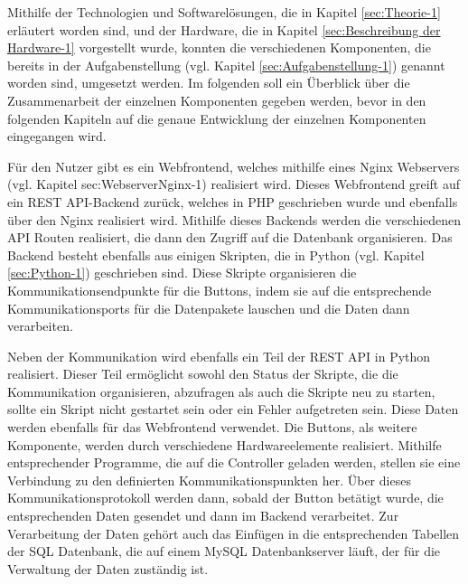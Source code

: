 Mithilfe der Technologien und Softwarelösungen, die in Kapitel \ref{sec:Theorie-1} erläutert worden sind, und der Hardware, die in Kapitel \ref{sec:Beschreibung der Hardware-1} vorgestellt wurde, konnten die verschiedenen Komponenten, die bereits in der Aufgabenstellung (vgl. Kapitel \ref{sec:Aufgabenstellung-1}) genannt worden sind, umgesetzt werden. 
Im folgenden soll ein Überblick über die Zusammenarbeit der einzelnen Komponenten gegeben werden, bevor in den folgenden Kapiteln auf die genaue Entwicklung der einzelnen Komponenten eingegangen wird. 

Für den Nutzer gibt es ein Webfrontend, welches mithilfe eines Nginx Webservers (vgl. Kapitel {sec:WebserverNginx-1}) realisiert wird. Dieses Webfrontend greift auf ein \ac{REST} \ac{API}-Backend zurück, welches in \ac{PHP} geschrieben wurde und ebenfalls über den Nginx realisiert wird. Mithilfe dieses Backends werden die verschiedenen \ac{API} Routen realisiert, die dann den Zugriff auf die Datenbank organisieren. Das Backend besteht ebenfalls aus einigen Skripten, die in Python (vgl. Kapitel \ref{sec:Python-1}) geschrieben sind. Diese Skripte organisieren die Kommunikationsendpunkte für die Buttons, indem sie auf die entsprechende Kommunikationsports für die Datenpakete lauschen und die Daten dann verarbeiten. 

Neben der Kommunikation wird ebenfalls ein Teil der \ac{REST} \ac{API} in Python realisiert. Dieser Teil ermöglicht sowohl den Status der Skripte, die die Kommunikation organisieren, abzufragen als auch die Skripte neu zu starten, sollte ein Skript nicht gestartet sein oder ein Fehler aufgetreten sein. Diese Daten werden ebenfalls für das Webfrontend verwendet. 
Die Buttons, als weitere Komponente, werden durch verschiedene Hardwareelemente realisiert. Mithilfe entsprechender Programme, die auf die Controller geladen werden, stellen sie eine Verbindung zu den definierten Kommunikationspunkten her. Über dieses Kommunikationsprotokoll werden dann, sobald der Button betätigt wurde, die entsprechenden Daten gesendet und dann im Backend verarbeitet. 
Zur Verarbeitung der Daten gehört auch das Einfügen in die entsprechenden Tabellen der SQL Datenbank, die auf einem MySQL Datenbankserver läuft, der für die Verwaltung der Daten zuständig ist. 
